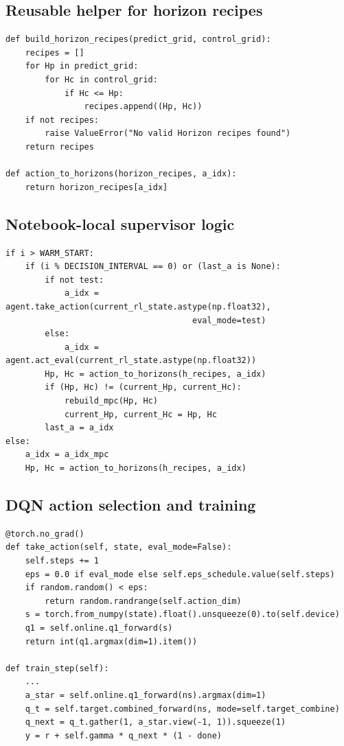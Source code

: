 \documentclass[11pt]{article}
\begin{document}
\subsection*{Reusable helper for horizon recipes}

\begin{lstlisting}
def build_horizon_recipes(predict_grid, control_grid):
    recipes = []
    for Hp in predict_grid:
        for Hc in control_grid:
            if Hc <= Hp:
                recipes.append((Hp, Hc))
    if not recipes:
        raise ValueError("No valid Horizon recipes found")
    return recipes

def action_to_horizons(horizon_recipes, a_idx):
    return horizon_recipes[a_idx]
\end{lstlisting}

\subsection*{Notebook-local supervisor logic}

\begin{lstlisting}
if i > WARM_START:
    if (i % DECISION_INTERVAL == 0) or (last_a is None):
        if not test:
            a_idx = agent.take_action(current_rl_state.astype(np.float32),
                                      eval_mode=test)
        else:
            a_idx = agent.act_eval(current_rl_state.astype(np.float32))
        Hp, Hc = action_to_horizons(h_recipes, a_idx)
        if (Hp, Hc) != (current_Hp, current_Hc):
            rebuild_mpc(Hp, Hc)
            current_Hp, current_Hc = Hp, Hc
        last_a = a_idx
else:
    a_idx = a_idx_mpc
    Hp, Hc = action_to_horizons(h_recipes, a_idx)
\end{lstlisting}

\subsection*{DQN action selection and training}

\begin{lstlisting}
@torch.no_grad()
def take_action(self, state, eval_mode=False):
    self.steps += 1
    eps = 0.0 if eval_mode else self.eps_schedule.value(self.steps)
    if random.random() < eps:
        return random.randrange(self.action_dim)
    s = torch.from_numpy(state).float().unsqueeze(0).to(self.device)
    q1 = self.online.q1_forward(s)
    return int(q1.argmax(dim=1).item())

def train_step(self):
    ...
    a_star = self.online.q1_forward(ns).argmax(dim=1)
    q_t = self.target.combined_forward(ns, mode=self.target_combine)
    q_next = q_t.gather(1, a_star.view(-1, 1)).squeeze(1)
    y = r + self.gamma * q_next * (1 - done)
\end{lstlisting}
\end{document}
